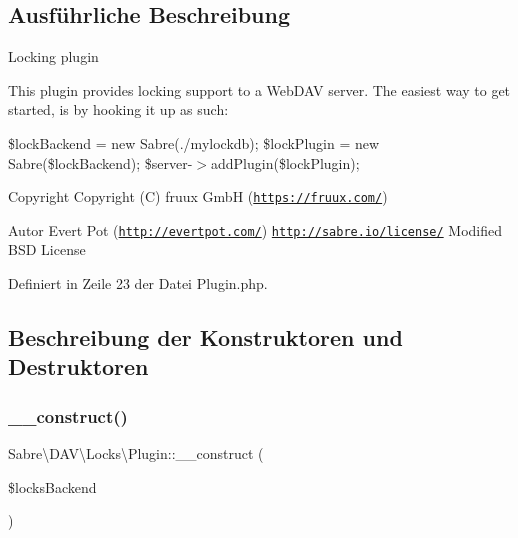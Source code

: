 \subsection{Ausführliche Beschreibung}
Locking plugin

This plugin provides locking support to a Web\+D\+AV server. The easiest way to get started, is by hooking it up as such\+:

\$lock\+Backend = new Sabre(\textquotesingle{}./mylockdb\textquotesingle{}); \$lock\+Plugin = new Sabre(\$lock\+Backend); \$server-\/$>$add\+Plugin(\$lock\+Plugin);

\begin{DoxyCopyright}{Copyright}
Copyright (C) fruux GmbH (\href{https://fruux.com/}{\tt https\+://fruux.\+com/}) 
\end{DoxyCopyright}
\begin{DoxyAuthor}{Autor}
Evert Pot (\href{http://evertpot.com/}{\tt http\+://evertpot.\+com/})  \href{http://sabre.io/license/}{\tt http\+://sabre.\+io/license/} Modified B\+SD License 
\end{DoxyAuthor}


Definiert in Zeile 23 der Datei Plugin.\+php.



\subsection{Beschreibung der Konstruktoren und Destruktoren}
\mbox{\label{class_sabre_1_1_d_a_v_1_1_locks_1_1_plugin_a29c2fc50079fa2931884a63482eadebd}} 
\subsubsection{\texorpdfstring{\+\_\+\+\_\+construct()}{\_\_construct()}}
{\footnotesize\ttfamily Sabre\textbackslash{}\+D\+A\+V\textbackslash{}\+Locks\textbackslash{}\+Plugin\+::\+\_\+\+\_\+construct (\begin{DoxyParamCaption}\item[{\mbox{\hyperlink{interface_sabre_1_1_d_a_v_1_1_locks_1_1_backend_1_1_backend_interface}{Backend\textbackslash{}\+Backend\+Interface}}}]{\$locks\+Backend }\end{DoxyParamCaption})}


